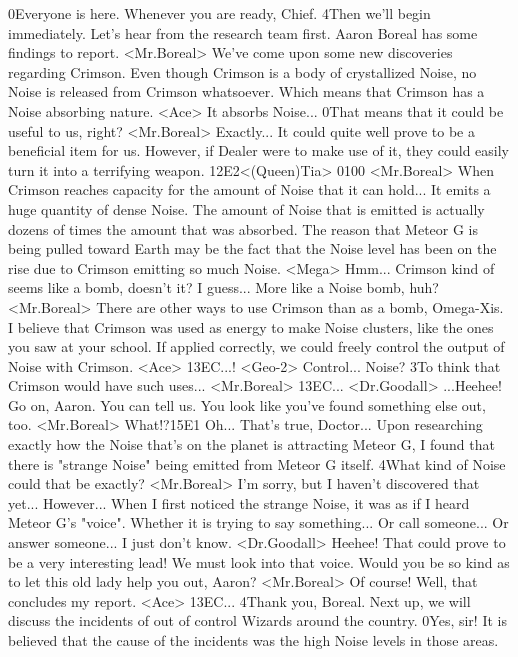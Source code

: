 0Everyone is here. 
Whenever you are ready, Chief. 
4Then we'll begin immediately. 
Let's hear from the research team first. 
Aaron Boreal has some findings to report. 
<Mr.Boreal> We've come upon some new discoveries regarding Crimson. 
Even though Crimson is a body of crystallized Noise, 
no Noise is released from Crimson whatsoever. 
Which means that Crimson has a Noise absorbing nature. 
<Ace> It absorbs Noise... 
0That means that it could be useful to us, right? 
<Mr.Boreal> Exactly... 
It could quite well prove to be a beneficial item for us. 
However, if Dealer were to make use of it, they could 
easily turn it into a terrifying weapon. 
{12}{E2}<(Queen)Tia> {01}{00} 
<Mr.Boreal> When Crimson reaches capacity for the amount of Noise that it can hold... 
It emits a huge quantity of dense Noise. 
The amount of Noise that is emitted is actually dozens 
of times the amount that was absorbed. 
The reason that Meteor G is being pulled toward Earth may be the fact that the 
Noise level has been on the rise due to Crimson emitting so much Noise. 
<Mega> Hmm... Crimson kind of seems like a bomb, doesn't it? 
I guess... More like a Noise bomb, huh? 
<Mr.Boreal> There are other ways to use Crimson than as a bomb, Omega-Xis. 
I believe that Crimson was used as energy to make 
Noise clusters, like the ones you saw at your school. 
If applied correctly, we could freely control the output of Noise with Crimson. 
<Ace> {13}{EC}...! 
<Geo-2> Control... Noise? 
3To think that Crimson would have such uses... 
<Mr.Boreal> {13}{EC}... 
<Dr.Goodall> ...Heehee! 
Go on, Aaron. You can tell us. 
You look like you've found something else out, too. 
<Mr.Boreal> What!?{15}{E1} Oh... That's true, Doctor... 
Upon researching exactly how the Noise that's on the planet is attracting Meteor 
G, I found that there is "strange Noise" being emitted from Meteor G itself. 
4What kind of Noise could that be exactly? 
<Mr.Boreal> I'm sorry, but I haven't discovered that yet... 
However... 
When I first noticed the strange Noise, it was as if I heard Meteor G's "voice". 
Whether it is trying to say something... Or call someone... Or answer someone... 
I just don't know. 
<Dr.Goodall> Heehee! That could prove to be a very interesting lead! 
We must look into that voice. 
Would you be so kind as to let this old lady help you out, Aaron? 
<Mr.Boreal> Of course! 
Well, that concludes my report. 
<Ace> {13}{EC}... 
4Thank you, Boreal. 
Next up, we will discuss the incidents of out of control Wizards around the country. 
0Yes, sir! 
It is believed that the cause of the incidents was the high Noise levels in those areas. 

